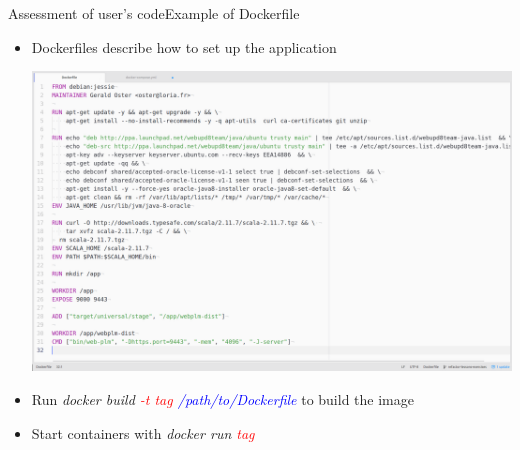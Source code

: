 \documentclass{beamer}
\begin{document}
\begin{frame}{Assessment of user's code}{Example of Dockerfile}
  \begin{itemize}
  \item {
    Dockerfiles describe how to set up the application
  }
  \begin{center}
    \includegraphics[scale=0.12]{img/dockerfile-white.png}
  \end{center}
  \item {
    Run \emph{docker build \textcolor{red}{-t tag} \textcolor{blue}{/path/to/Dockerfile}} to build  the image
  }
  \item {
    Start containers with \emph{docker run \textcolor{red}{tag}}
  }
  \end{itemize}
\end{frame}

{ %
  \begin{frame}[plain]
  \end{frame}
}
\end{document}
